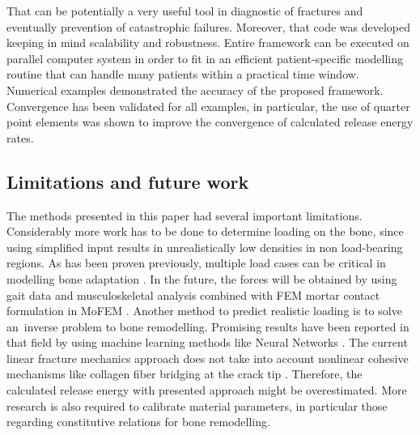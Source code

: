 \documentclass[11pt]{acmeArticle}
\numberwithin{equation}{section}
\begin{document}
That can be potentially a very useful tool in diagnostic of fractures and eventually prevention of catastrophic failures. 
Moreover, that code was developed keeping in mind scalability and robustness. 
Entire framework can be executed on parallel computer system in order to fit in an efficient patient-specific modelling routine that can handle many patients within a practical time window. \\
Numerical examples demonstrated the accuracy of the proposed framework. 
Convergence has been validated for all examples, in particular, the use of quarter point elements was shown to improve the convergence of calculated release energy rates. 
\subsection{Limitations and future work}
The methods presented in this paper had several important limitations. 
Considerably more work has to be done to determine loading on the bone, since using simplified input results in unrealistically low densities in non load-bearing regions. 
As has been proven previously, multiple load cases can be critical in modelling bone adaptation \citep{geraldes2016consideration}. In the future, the forces will be obtained by using gait data and musculoskeletal analysis \citep{Delp2007} combined with FEM mortar contact formulation in MoFEM \citep{athanasiadis2018mortar}. 
Another method to predict realistic loading is to solve an~inverse problem to bone remodelling. 
Promising results have been reported in that field by using machine learning methods like Neural Networks \citep{campoli2012computational}. 
The current linear fracture mechanics approach does not take into account nonlinear cohesive mechanisms like collagen fiber bridging at the crack tip \citep{yang2006fracture}. 
Therefore, the calculated release energy with presented approach might be overestimated. 
More research is also required to calibrate material parameters, in particular those regarding constitutive relations for bone remodelling. 




\end{document}
